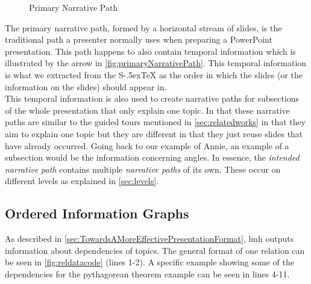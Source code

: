 \documentclass[twoside, 12pt]{article}
\def\stex{\texorpdfstring{\raisebox{-.5ex}S\kern-.5ex\TeX}{sTeX}\xspace}
\begin{document}
\begin{figure}
\vspace{-20pt}
  \begin{center}
  \end{center}
\vspace{-16pt}
  \caption{Primary Narrative Path}
  \label{fig:primaryNarrativePath}
\vspace{12pt}
\end{figure}

\begin{figure}
\vspace{-50pt}
\end{figure}

The primary narrative path, formed by a horizontal stream of slides, is the traditional path a presenter normally uses when preparing a PowerPoint presentation. This path happens to also contain temporal information which is illustrated by the arrow in \autoref{fig:primaryNarrativePath}. This temporal information is what we extracted from the \stex as the order in which the slides (or the information on the slides) should appear in.\\

This temporal information is also used to create narrative paths for subsections of the whole presentation that only explain one topic. In that these narrative paths are similar to the guided tours mentioned in \autoref{sec:relatedworks} in that they aim to explain one topic but they are different in that they just reuse slides that have already occurred. Going back to our example of Annie, an example of a subsection would be the information concerning angles. In essence, the \textit{intended narrative path} contains multiple \textit{narrative paths} of its own. These occur on different levels as explained in \autoref{sec:levels}.\\

\subsection{Ordered Information Graphs}
\label{sec:orderedInfoGraphs}

As described in \autoref{sec:TowardsAMoreEffectivePresentationFormat}, lmh outputs information about dependencies of topics. The general format of one relation can be seen in \autoref{fig:reldatacode} (lines 1-2). A specific example showing some of the dependencies for the pythagorean theorem example can be seen in lines 4-11.\\
\end{document}
